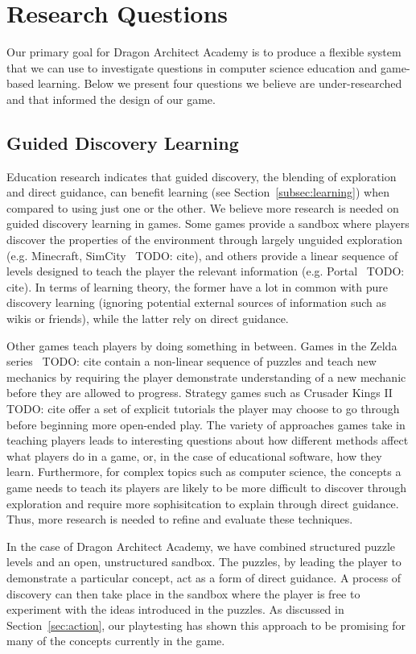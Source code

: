 \documentclass{sig-alternate}
\newcommand{\TODO}[1]{{\color{red} TODO: #1}}
\newcommand{\gametitle}{{\color{RoyalPurple} Dragon Architect Academy}}
\begin{document}
\section{Research Questions}
\label{sec:research}
Our primary goal for \gametitle{} is to produce a flexible system that we can use to investigate questions in computer science education and game-based learning. 
Below we present four questions we believe are under-researched and that informed the design of our game. 

\subsection{Guided Discovery Learning}
Education research indicates that guided discovery, the blending of exploration and direct guidance, can benefit learning (see Section~\ref{subsec:learning}) when compared to using just one or the other. 
We believe more research is needed on guided discovery learning in games. 
Some games provide a sandbox where players discover the properties of the environment through largely unguided exploration (e.g. Minecraft, SimCity~\TODO{cite}), and others provide a linear sequence of levels designed to teach the player the relevant information (e.g. Portal~\TODO{cite}). 
In terms of learning theory, the former have a lot in common with pure discovery learning (ignoring potential external sources of information such as wikis or friends), while the latter rely on direct guidance. 

Other games teach players by doing something in between. 
Games in the Zelda series~\TODO{cite} contain a non-linear sequence of puzzles and teach new mechanics by requiring the player demonstrate understanding of a new mechanic before they are allowed to progress. 
Strategy games such as Crusader Kings II~\TODO{cite} offer a set of explicit tutorials the player may choose to go through before beginning more open-ended play.
The variety of approaches games take in teaching players leads to interesting questions about how different methods affect what players do in a game, or, in the case of educational software, how they learn. 
Furthermore, for complex topics such as computer science, the concepts a game needs to teach its players are likely to be more difficult to discover through exploration and require more sophisitcation to explain through direct guidance. Thus, more research is needed to refine and evaluate these techniques. 

In the case of \gametitle{}, we have combined structured puzzle levels and an open, unstructured sandbox. 
The puzzles, by leading the player to demonstrate a particular concept, act as a form of direct guidance. 
A process of discovery can then take place in the sandbox where the player is free to experiment with the ideas introduced in the puzzles. 
As discussed in Section~\ref{sec:action}, our playtesting has shown this approach to be promising for many of the concepts currently in the game. 
\end{document}
